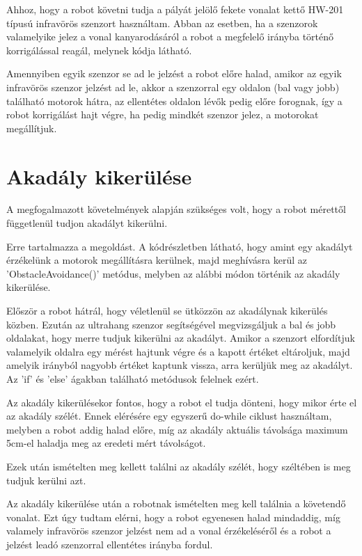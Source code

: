 \documentclass[]{thesis-ekf}
\theoremstyle{definition}
\begin{document}
Ahhoz, hogy a robot követni tudja a pályát jelölő fekete vonalat kettő HW-201 típusú infravörös szenzort használtam. Abban az esetben, ha a szenzorok valamelyike jelez a vonal kanyarodásáról a robot a megfelelő irányba történő korrigálással reagál, melynek kódja  látható.

Amennyiben egyik szenzor se ad le jelzést a robot előre halad, amikor az egyik infravörös szenzor jelzést ad le, akkor a szenzorral egy oldalon (bal vagy jobb) található motorok hátra, az ellentétes oldalon lévők pedig előre forognak, így a robot korrigálást hajt végre, ha pedig mindkét szenzor jelez, a motorokat megállítjuk.
\section{Akadály kikerülése}
A megfogalmazott követelmények alapján szükséges volt, hogy a robot mérettől függetlenül tudjon akadályt kikerülni.

Erre  tartalmazza a megoldást. A kódrészletben látható, hogy amint egy akadályt érzékelünk a motorok megállításra kerülnek, majd meghívásra kerül az 'ObstacleAvoidance()' metódus, melyben az alábbi módon történik az akadály kikerülése.


Először a robot hátrál, hogy véletlenül se ütközzön az akadálynak kikerülés közben. Ezután az ultrahang szenzor segítségével megvizsgáljuk a bal és jobb oldalakat, hogy merre tudjuk kikerülni az akadályt. Amikor a szenzort elfordítjuk valamelyik oldalra egy mérést hajtunk végre és a kapott értéket eltároljuk, majd amelyik irányból nagyobb értéket kaptunk vissza, arra kerüljük meg az akadályt. Az 'if' és 'else' ágakban található metódusok felelnek ezért.

Az akadály kikerülésekor fontos, hogy a robot el tudja dönteni, hogy mikor érte el az akadály szélét. Ennek elérésére egy egyszerű do-while ciklust használtam, melyben a robot addig halad előre, míg az akadály aktuális távolsága maximum 5cm-el haladja meg az eredeti mért távolságot.

Ezek után ismételten meg kellett találni az akadály szélét, hogy széltében is meg tudjuk kerülni azt.

Az akadály kikerülése után a robotnak ismételten meg kell találnia a követendő vonalat. Ezt úgy tudtam elérni, hogy a robot egyenesen halad mindaddig, míg valamely infravörös szenzor jelzést nem ad a vonal érzékeléséről és a robot a jelzést leadó szenzorral ellentétes irányba fordul.
\end{document}
